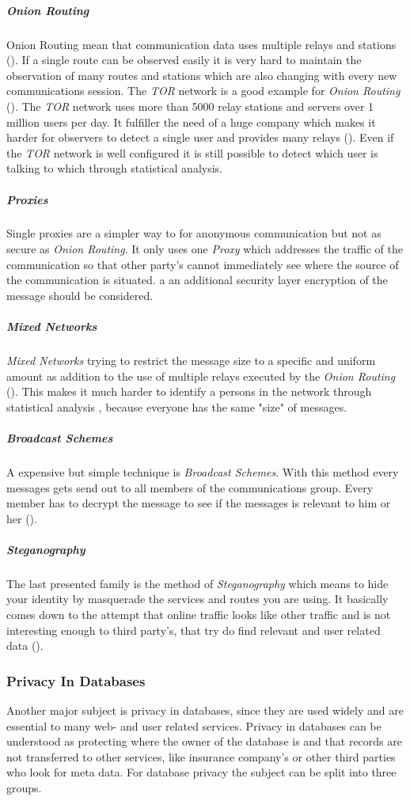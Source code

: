 \subparagraph{Onion Routing}
Onion Routing mean that communication data uses multiple relays and stations (\cite{goldschlag1999onion}). If a single route can be observed easily it is very hard to maintain the observation of many routes and stations which are also changing with every new communications session. The \textit{TOR} network is a good example for \textit{Onion Routing} (\cite{dingledine2004tor}). The \textit{TOR} network uses more than 5000 relay stations and servers over 1 million users per day. It fulfiller the need of a huge company which makes it harder for observers to detect a single user and provides many relays (\cite{danezis2015privacy}). Even if the \textit{TOR} network is well configured it is still possible to detect which user is talking to which through statistical analysis. 

\subparagraph{Proxies}
Single proxies are a simpler way to for anonymous communication but not as secure as \textit{Onion Routing}. It only uses one \textit{Proxy} which addresses the traffic of the communication so that other party's cannot immediately see where the source of the communication is situated. a an additional security layer encryption of the message should be considered.

\subparagraph{Mixed Networks}
\textit{Mixed Networks} trying to restrict the message size to a specific and uniform amount as addition to the use of multiple relays executed by the \textit{Onion Routing} (\cite{chaum1981untraceable}). This makes it much harder to identify a persons in the network through statistical analysis , because everyone has the same "size" of messages.

\subparagraph{Broadcast Schemes}
A expensive but simple technique is \textit{Broadcast Schemes}. With this method every messages gets send out to all members of the communications group. Every member has to decrypt the message to see if the messages is relevant to him or her (\cite{stajano2000cocaine}).

\subparagraph{Steganography}
The last presented family is the method of \textit{Steganography} which means to hide your identity by masquerade the services and routes you are using. It basically comes down to the attempt that online traffic looks like other traffic and is not interesting enough to third party's, that try do find relevant and user related data (\cite{katzenbeisser2000information}).

\subsubsection{Privacy In Databases}
\label{ssub:privacy_in_databases}
Another major subject is privacy in databases, since they are used widely and are essential to many web- and user related services. Privacy in databases can be understood as protecting where the owner of the database is and that records are not transferred to other services, like insurance company's or other third parties who look for meta data. For database privacy the subject can be split into three groups.

